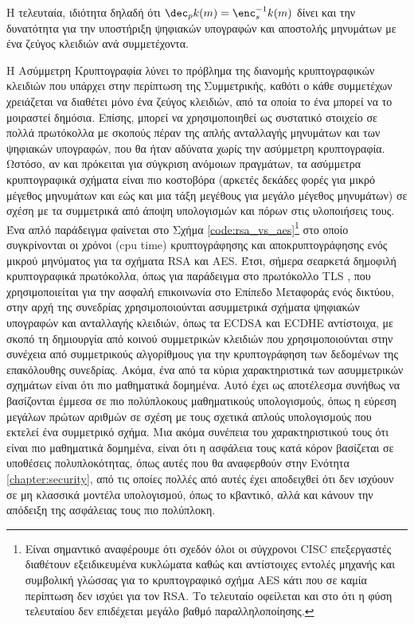 Η τελευταία, ιδιότητα δηλαδή ότι $\dec_pk(m)=\enc^{-1}_sk(m)$ δίνει και την δυνατότητα για την υποστήριξη ψηφιακών υπογραφών και αποστολής μηνυμάτων με ένα ζεύγος κλειδιών ανά συμμετέχοντα.

Η Ασύμμετρη Κρυπτογραφία λύνει το πρόβλημα της διανομής κρυπτογραφικών κλειδιών που υπάρχει στην περίπτωση της Συμμετρικής, καθότι ο κάθε συμμετέχων χρειάζεται να διαθέτει μόνο ένα ζεύγος κλειδιών, από τα οποία το ένα μπορεί να το μοιραστεί δημόσια. Επίσης, μπορεί να χρησιμοποιηθεί ως συστατικό στοιχείο σε πολλά πρωτόκολλα με σκοπούς πέραν της απλής ανταλλαγής μηνυμάτων και των ψηφιακών υπογραφών, που θα ήταν αδύνατα χωρίς την ασύμμετρη κρυπτογραφία. Ωστόσο, αν και πρόκειται για σύγκριση ανόμοιων πραγμάτων, τα ασύμμετρα κρυπτογραφικά σχήματα είναι πιο κοστοβόρα (αρκετές δεκάδες φορές για μικρό μέγεθος μηνυμάτων και εώς και μια τάξη μεγέθους για μεγάλο μέγεθος μηνυμάτων) σε σχέση με τα συμμετρικά από άποψη υπολογισμών και πόρων στις υλοποιήσεις τους. Ένα απλό παράδειγμα φαίνεται στο Σχήμα \ref{code:rsa_vs_aes}\footnote{Είναι σημαντικό αναφέρουμε ότι σχεδόν όλοι οι σύγχρονοι CISC επεξεργαστές διαθέτουν εξειδικευμένα κυκλώματα καθώς και αντίστοιχες εντολές μηχανής και συμβολική γλώσσας για το κρυπτογραφικό σχήμα AES κάτι που σε καμία περίπτωση δεν ισχύει για τον RSA. Το τελευταίο οφείλεται και στο ότι η φύση τελευταίου δεν επιδέχεται μεγάλο βαθμό παραλληλοποίησης.} στο οποίο συγκρίνονται οι χρόνοι (cpu time) κρυπτογράφησης και αποκρυπτογράφησης ενός μικρού μηνύματος για τα σχήματα RSA και AES. Έτσι, σήμερα σεαρκετά δημοφιλή κρυπτογραφικά πρωτόκολλα, όπως για παράδειγμα στο πρωτόκολλο TLS \cite{RFC8446}, που χρησιμοποιείται για την ασφαλή επικοινωνία στο Επίπεδο Μεταφοράς ενός δικτύου, στην αρχή της συνεδρίας χρησιμοποιούνται ασυμμετρικά σχήματα ψηφιακών υπογραφών και ανταλλαγής κλειδιών, όπως τα ECDSA και ECDHE αντίστοιχα, με σκοπό τη δημιουργία από κοινού συμμετρικών κλειδιών που χρησιμοποιούνται στην συνέχεια από συμμετρικούς αλγορίθμους για την κρυπτογράφηση των δεδομένων της επακόλουθης συνεδρίας. Ακόμα, ένα από τα κύρια χαρακτηριστικά των ασυμμετρικών σχημάτων είναι ότι πιο μαθηματικά δομημένα. Αυτό έχει ως αποτέλεσμα συνήθως να βασίζονται έμμεσα σε πιο πολύπλοκους μαθηματικούς υπολογισμούς, όπως η εύρεση μεγάλων πρώτων αριθμών σε σχέση με τους σχετικά απλούς υπολογισμούς που εκτελεί ένα συμμετρικό σχήμα. Μια ακόμα συνέπεια του χαρακτηριστικού τους ότι είναι πιο μαθηματικά δομημένα, είναι ότι η ασφάλεια τους κατά κόρον βασίζεται σε υποθέσεις πολυπλοκότητας, όπως αυτές που θα αναφερθούν στην Ενότητα \ref{chapter:security}, από τις οποίες πολλές από αυτές έχει αποδειχθεί ότι δεν ισχύουν σε μη κλασσικά μοντέλα υπολογισμού, όπως το κβαντικό, αλλά και κάνουν την απόδειξη της ασφάλειας τους πιο πολύπλοκη.

